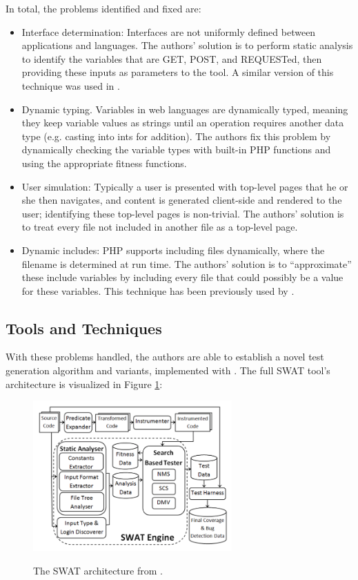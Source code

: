 \documentclass{sig-alternate-05-2015}
\begin{document}
In total, the problems identified and fixed are:
\begin{itemize}
\item Interface determination: Interfaces are not uniformly defined between applications and languages. The authors' solution is to perform static analysis to identify the variables that are GET, POST, and REQUESTed, then providing these inputs as parameters to the tool. A similar version of this technique was used in \cite{halfond2009precise}. 
\item Dynamic typing. Variables in web languages are dynamically typed, meaning they keep variable values as strings until an operation requires another data type (e.g. casting into ints for addition). The authors fix this problem by dynamically checking the variable types with built-in PHP functions and using the appropriate fitness functions.
\item User simulation: Typically a user is presented with top-level pages that he or she then navigates, and content is generated client-side and rendered to the user; identifying these top-level pages is non-trivial. The authors' solution is to treat every file not included in another file as a top-level page. 
\item Dynamic includes: PHP supports including files dynamically, where the filename is determined at run time. The authors' solution is to ``approximate'' these include variables by including every file that could possibly be a value for these variables. This technique has been previously used by \cite{wassermann2007sound}.
\end{itemize}

\subsection{Tools and Techniques}
With these problems handled, the authors are able to establish a novel test generation algorithm and variants, implemented with \cite{bouwersphp, bravenboer2008stratego}. The full SWAT tool's architecture is visualized in Figure \ref{fig:swat}: 

\begin{figure}[!h]
\centering
\includegraphics[width=3in]{images/swat.png}
\label{fig:swat}
\caption{The SWAT architecture from \cite{alshahwan2011automated}.}
\end{figure}
\end{document}
